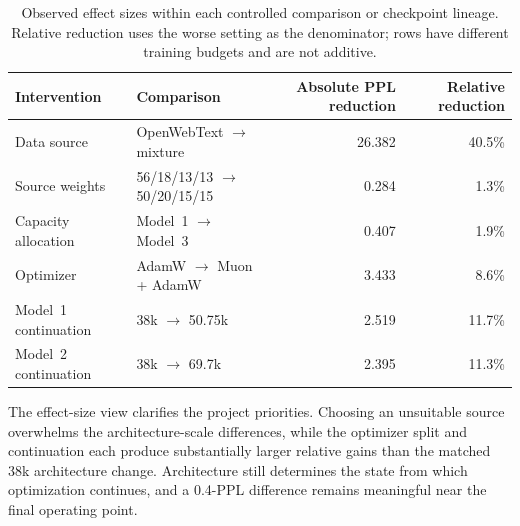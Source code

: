 \documentclass{article}
\begin{document}
\begin{table}[H]
  \caption{Observed effect sizes within each controlled comparison or
  checkpoint lineage. Relative reduction uses the worse setting as the
  denominator; rows have different training budgets and are not additive.}
  \label{tab:effect-sizes}
  \centering
  \small
  \setlength{\tabcolsep}{6pt}
  \begin{tabular}{@{}llrr@{}}
    \toprule
    Intervention & Comparison & Absolute PPL reduction & Relative reduction \\
    \midrule
    Data source & OpenWebText $\rightarrow$ mixture & 26.382 & 40.5\% \\
    Source weights & 56/18/13/13 $\rightarrow$ 50/20/15/15 & 0.284 & 1.3\% \\
    Capacity allocation & Model~1 $\rightarrow$ Model~3 & 0.407 & 1.9\% \\
    Optimizer & AdamW $\rightarrow$ Muon + AdamW & 3.433 & 8.6\% \\
    Model~1 continuation & 38k $\rightarrow$ 50.75k & 2.519 & 11.7\% \\
    Model~2 continuation & 38k $\rightarrow$ 69.7k & 2.395 & 11.3\% \\
    \bottomrule
  \end{tabular}
\end{table}

The effect-size view clarifies the project priorities. Choosing an unsuitable
source overwhelms the architecture-scale differences, while the optimizer
split and continuation each produce substantially larger relative gains than
the matched 38k architecture change. Architecture still determines the state
from which optimization continues, and a 0.4-PPL difference remains meaningful
near the final operating point.
\end{document}
